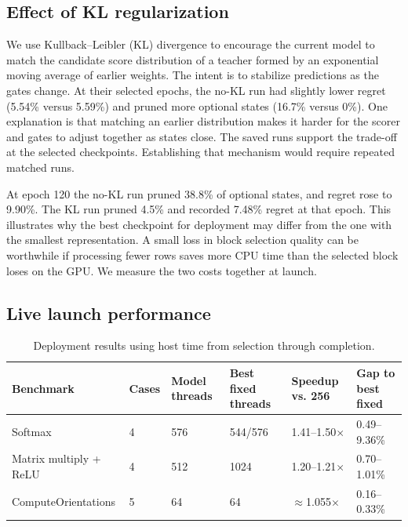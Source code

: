 \documentclass[11pt,letterpaper]{article}
\begin{document}
\subsection{Effect of KL regularization}

We use Kullback--Leibler (KL) divergence to encourage the current model to match the candidate score
distribution of a teacher formed by an exponential moving average of earlier weights. The intent is to
stabilize predictions as the gates change. At their selected epochs, the no-KL run had slightly lower regret
(5.54\% versus 5.59\%) and pruned more optional states (16.7\% versus 0\%). One explanation is that matching
an earlier distribution makes it harder for the scorer and gates to adjust together as states close. The
saved runs support the trade-off at the selected checkpoints. Establishing that mechanism would require
repeated matched runs.

At epoch 120 the no-KL run pruned 38.8\% of optional states, and regret rose to 9.90\%. The KL run pruned
4.5\% and recorded 7.48\% regret at that epoch. This illustrates why the best checkpoint for deployment may
differ from the one with the smallest representation. A small loss in block selection quality can be
worthwhile if processing fewer rows saves more CPU time than the selected block loses on the GPU. We measure
the two costs together at launch.

\subsection{Live launch performance}

\begin{table}[H]
\centering\small
\caption{Deployment results using host time from selection through completion.}
\begin{tabularx}{\linewidth}{@{}L{.24\linewidth}YYYYY@{}}
\toprule
\textbf{Benchmark} & \textbf{Cases} & \textbf{Model threads} & \textbf{Best fixed threads} & \textbf{Speedup vs. 256} & \textbf{Gap to best fixed} \\
\midrule
Softmax & 4 & 576 & 544/576 & 1.41--1.50\ensuremath{\times} & 0.49--9.36\% \\
Matrix multiply + ReLU & 4 & 512 & 1024 & 1.20--1.21\ensuremath{\times} & 0.70--1.01\% \\
ComputeOrientations & 5 & 64 & 64 & \ensuremath{\approx}1.055\ensuremath{\times} & 0.16--0.33\% \\
\bottomrule
\end{tabularx}
\end{table}
\end{document}
